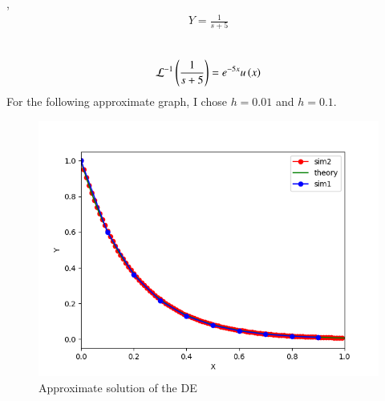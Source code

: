 \documentclass[journal]{IEEEtran}
\begin{document}
    ,\\
\begin{align}
    Y = \frac{1}{s + 5}\\
\end{align}
    \\
\begin{align}
    \mathcal{L}^{-1}\left(\frac{1}{s+5}\right) = e^{-5x}u\left(x\right)
\end{align}
For the following approximate graph, I chose $h = 0.01$ and $h = 0.1$.
\begin{figure}[h!]
   \centering
   \includegraphics[width=0.7\columnwidth]{figs/fig.png}
    \caption{Approximate solution of the DE}
\end{figure}
\end{document}
